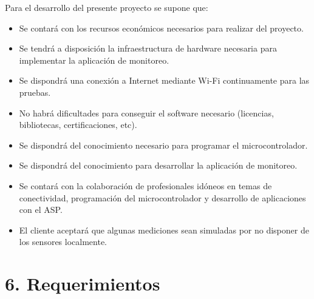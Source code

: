 \documentclass[
11pt, %
]{charter}
\begin{document}
Para el desarrollo del presente proyecto se supone que: 
\begin{itemize}
	\item Se contará con los recursos económicos necesarios para realizar del proyecto.
	\item Se tendrá a disposición la infraestructura de hardware necesaria para implementar la aplicación de monitoreo.
	\item Se dispondrá una conexión a Internet mediante Wi-Fi continuamente para las pruebas.
	\item No habrá dificultades para conseguir el software necesario (licencias, bibliotecas, certificaciones, etc).
	\item Se dispondrá del conocimiento necesario para programar el microcontrolador.
	\item Se dispondrá del conocimiento para desarrollar la aplicación de monitoreo.
	\item Se contará con la colaboración de profesionales idóneos en temas de conectividad, programación del microcontrolador y desarrollo de aplicaciones con el ASP.
	\item El cliente aceptará que algunas mediciones sean simuladas por no disponer de los sensores localmente.
\end{itemize}

\section{6. Requerimientos}
\label{sec:requerimientos}
\end{document}
